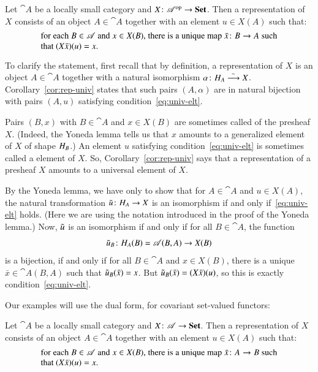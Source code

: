 \begin{cor}
\label{cor:rep-univ}
Let $\cat{A}$ be a locally small category and $X\from \cat{A}^\op \to \Set$.
Then a representation of $X$ consists of an object $A \in \cat{A}$ together
with an element $u \in X(A)$ such that:
%
\begin{equation}
\label{eq:univ-elt}
\parbox{.8\textwidth}{%
for each $B \in \cat{A}$ and $x \in X(B)$, there is a unique map $\bar{x}\from
B \to A$ such that $(X\bar{x})(u) = x$.%
}
\end{equation}
%
\end{cor}
%
To clarify the statement, first recall that by definition, a representation
of $X$ is an object $A \in \cat{A}$ together with a natural isomorphism
$\alpha\from \h_A \toiso X$.  Corollary~\ref{cor:rep-univ} states that such
pairs $(A, \alpha)$ are in natural bijection with pairs $(A, u)$ satisfying
condition~\eqref{eq:univ-elt}.

Pairs $(B, x)$ with $B \in \cat{A}$ and $x \in X(B)$ are sometimes called
%
%
%
%
of the presheaf $X$.  (Indeed, the Yoneda lemma tells us that $x$ amounts
to a generalized element of $X$ of shape $H_B$.)  An element $u$
satisfying condition~\eqref{eq:univ-elt} is sometimes called a
%
%
%
%
element of $X$.  So, Corollary~\ref{cor:rep-univ} says that a
representation of a presheaf $X$ amounts to a universal element of $X$.

\begin{pf}
By the Yoneda lemma, we have only to show that for $A \in \cat{A}$ and $u
\in X(A)$, the natural transformation $\ynt{u}\from \h_A \to X$ is an
isomorphism if and only if~\eqref{eq:univ-elt} holds.  (Here we are using
the notation introduced in the proof of the Yoneda lemma.)  Now, $\tilde{u}$
is an isomorphism if and only if for all $B \in \cat{A}$, the function
\[
\ynt{u}_B\from \h_A(B) = \cat{A}(B, A) \to X(B)
\]
is a bijection, if and only if for all $B \in \cat{A}$ and $x \in X(B)$, there
is a unique $\bar{x} \in \cat{A}(B, A)$ such that $\tilde{u}_B(\bar{x}) = x$.
But $\tilde{u}_B(\bar{x}) = (X\bar{x})(u)$, so this is exactly
condition~\eqref{eq:univ-elt}.
\end{pf}

Our examples will use the dual form, for covariant set-valued functors:

\begin{cor}
\label{cor:rep-univ-dual}
Let $\cat{A}$ be a locally small category and $X\from \cat{A} \to \Set$.  Then
a representation of $X$ consists of an object $A \in \cat{A}$ together with an
element $u \in X(A)$ such that:
%
\begin{equation}
\label{eq:univ-elt-dual}
\parbox{.8\textwidth}{%
for each $B \in \cat{A}$ and $x \in X(B)$, there is a unique map $\bar{x}\from
A \to B$ such that $(X\bar{x})(u) = x$.%
}
\end{equation}
%
\end{cor}

